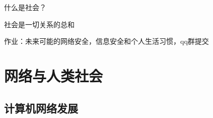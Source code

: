\begin{question}
    什么是社会？
\end{question}
社会是一切关系的总和

作业：未来可能的网络安全，信息安全和个人生活习惯，qq群提交
\section{网络与人类社会}%
\label{sec:网络与人类社会}
\subsection{计算机网络发展}%
\label{sub:计算机网络发展}



